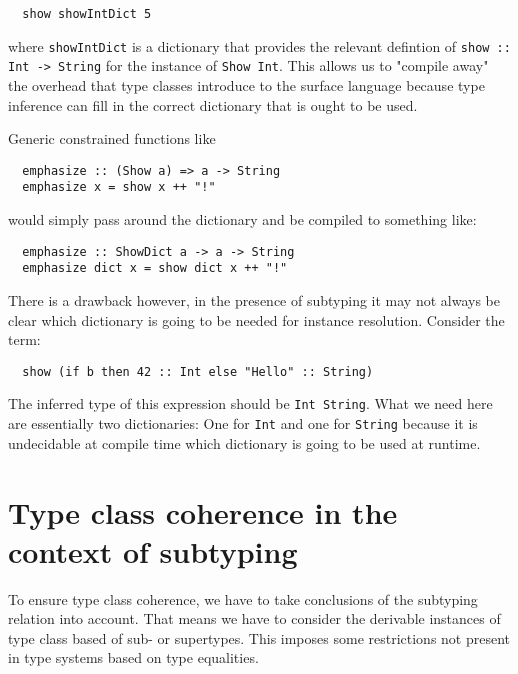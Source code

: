 \begin{verbatim}
  show showIntDict 5
\end{verbatim}

where \texttt{showIntDict} is a dictionary that provides the relevant defintion of \texttt{show :: Int -> String} for the instance of \texttt{Show Int}.
This allows us to "compile away" the overhead that type classes introduce to the surface language because type inference can fill in the correct dictionary that is ought to be used.

Generic constrained functions like

\begin{verbatim}
  emphasize :: (Show a) => a -> String
  emphasize x = show x ++ "!"
\end{verbatim}

would simply pass around the dictionary and be compiled to something like:

\begin{verbatim}
  emphasize :: ShowDict a -> a -> String
  emphasize dict x = show dict x ++ "!"
\end{verbatim}

\cite{kiselyov}

There is a drawback however, in the presence of subtyping it may not always be clear which dictionary is going to be needed for instance resolution.
Consider the term:

\begin{verbatim}
  show (if b then 42 :: Int else "Hello" :: String)
\end{verbatim}

The inferred type of this expression should be \texttt{Int \/ String}.
What we need here are essentially two dictionaries: One for \texttt{Int} and one for \texttt{String} because it is undecidable at compile time which dictionary is going to be used at runtime.


\section{Type class coherence in the context of subtyping}
To ensure type class coherence, we have to take conclusions of the subtyping relation into account.
That means we have to consider the derivable instances of type class based of sub- or supertypes.
This imposes some restrictions not present in type systems based on type equalities.

